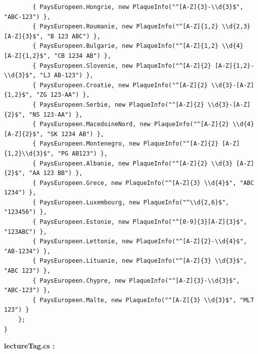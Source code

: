 \documentclass[main.tex]{subfiles}
\begin{document}
\begin{lstlisting}
        { PaysEuropeen.Hongrie, new PlaqueInfo("^[A-Z]{3}-\\d{3}$", "ABC-123") },
        { PaysEuropeen.Roumanie, new PlaqueInfo("^[A-Z]{1,2} \\d{2,3} [A-Z]{3}$", "B 123 ABC") },
        { PaysEuropeen.Bulgarie, new PlaqueInfo("^[A-Z]{1,2} \\d{4} [A-Z]{1,2}$", "CB 1234 AB") },
        { PaysEuropeen.Slovenie, new PlaqueInfo("^[A-Z]{2} [A-Z]{1,2}-\\d{3}$", "LJ AB-123") },
        { PaysEuropeen.Croatie, new PlaqueInfo("^[A-Z]{2} \\d{3}-[A-Z]{1,2}$", "ZG 123-AA") },
        { PaysEuropeen.Serbie, new PlaqueInfo("^[A-Z]{2} \\d{3}-[A-Z]{2}$", "NS 123-AA") },
        { PaysEuropeen.MacedoineNord, new PlaqueInfo("^[A-Z]{2} \\d{4} [A-Z]{2}$", "SK 1234 AB") },
        { PaysEuropeen.Montenegro, new PlaqueInfo("^[A-Z]{2} [A-Z]{1,2}\\d{3}$", "PG AB123") },
        { PaysEuropeen.Albanie, new PlaqueInfo("^[A-Z]{2} \\d{3} [A-Z]{2}$", "AA 123 BB") },
        { PaysEuropeen.Grece, new PlaqueInfo("^[A-Z]{3} \\d{4}$", "ABC 1234") },
        { PaysEuropeen.Luxembourg, new PlaqueInfo("^\\d{2,6}$", "123456") },
        { PaysEuropeen.Estonie, new PlaqueInfo("^[0-9]{3}[A-Z]{3}$", "123ABC") },
        { PaysEuropeen.Lettonie, new PlaqueInfo("^[A-Z]{2}-\\d{4}$", "AB-1234") },
        { PaysEuropeen.Lituanie, new PlaqueInfo("^[A-Z]{3} \\d{3}$", "ABC 123") },
        { PaysEuropeen.Chypre, new PlaqueInfo("^[A-Z]{3}-\\d{3}$", "ABC-123") },
        { PaysEuropeen.Malte, new PlaqueInfo("^[A-Z]{3} \\d{3}$", "MLT 123") }
    };
}
\end{lstlisting}


\textbf{lectureTag.cs :}
\end{document}
